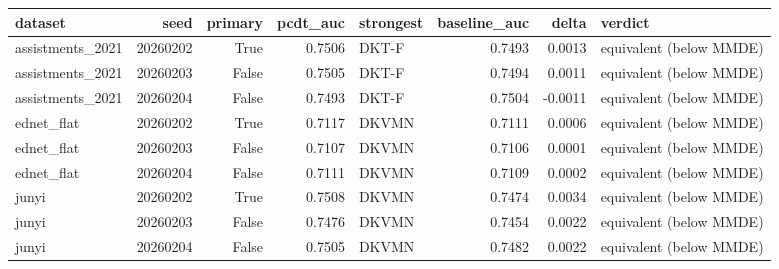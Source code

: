 \begin{tabular}{lrrrlrrl}
\toprule
dataset & seed & primary & pcdt\_auc & strongest & baseline\_auc & delta & verdict \\
\midrule
assistments\_2021 & 20260202 & True & 0.7506 & DKT-F & 0.7493 & 0.0013 & equivalent (below MMDE) \\
assistments\_2021 & 20260203 & False & 0.7505 & DKT-F & 0.7494 & 0.0011 & equivalent (below MMDE) \\
assistments\_2021 & 20260204 & False & 0.7493 & DKT-F & 0.7504 & -0.0011 & equivalent (below MMDE) \\
ednet\_flat & 20260202 & True & 0.7117 & DKVMN & 0.7111 & 0.0006 & equivalent (below MMDE) \\
ednet\_flat & 20260203 & False & 0.7107 & DKVMN & 0.7106 & 0.0001 & equivalent (below MMDE) \\
ednet\_flat & 20260204 & False & 0.7111 & DKVMN & 0.7109 & 0.0002 & equivalent (below MMDE) \\
junyi & 20260202 & True & 0.7508 & DKVMN & 0.7474 & 0.0034 & equivalent (below MMDE) \\
junyi & 20260203 & False & 0.7476 & DKVMN & 0.7454 & 0.0022 & equivalent (below MMDE) \\
junyi & 20260204 & False & 0.7505 & DKVMN & 0.7482 & 0.0022 & equivalent (below MMDE) \\
\bottomrule
\end{tabular}
